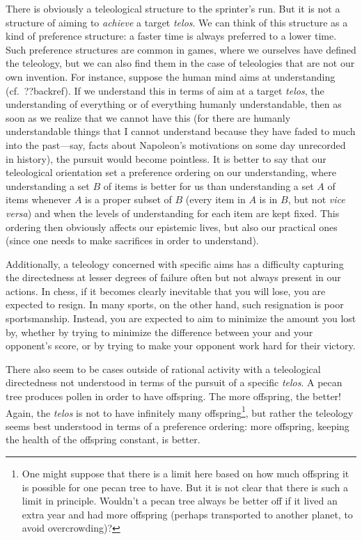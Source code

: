There is obviously a teleological structure to the sprinter's run. But it is not a structure of aiming to \textit{achieve} a 
target \textit{telos}. 
We can think of this structure as a kind of preference structure: a faster time is always preferred to a lower time. 
Such preference structures are common in games, where we ourselves have defined the teleology, but we can also find them in the 
case of teleologies that are not our own invention. For instance, suppose the human mind aims at understanding (cf.~??backref). If we understand
this in terms of aim at a target \textit{telos}, the understanding of everything or of everything humanly understandable, then as soon as 
we realize that we cannot have this (for there are humanly understandable things that I cannot understand because they have faded to much
into the past---say, facts about Napoleon's motivations on some day unrecorded in history), the pursuit would become pointless. 
It is better to say that our teleological orientation set a preference ordering on our understanding, where understanding a set
$B$ of items is better for us than understanding a set $A$ of items whenever $A$ is a proper subset of $B$ (every item in $A$ is
in $B$, but not \textit{vice versa}) and when the levels of understanding for each item are kept fixed. This ordering then obviously
affects our epistemic lives, but also our practical ones (since one needs to make sacrifices in order to understand).

Additionally, a teleology concerned with specific aims has a difficulty capturing the directedness at lesser
degrees of failure often but not always present in our actions. In chess, if it becomes clearly inevitable that
you will lose, you are expected to resign. In many sports, on the other hand, such resignation is poor sportsmanship.
Instead, you are expected to aim to minimize the amount you lost by, whether by trying to minimize the difference
between your and your opponent's score, or by trying to make your opponent work hard for their victory.

There also seem to be cases outside of rational activity with a teleological directedness not understood in terms of the pursuit of a specific \textit{telos}. 
A pecan tree produces pollen in order to have offspring. The more offspring, the better! Again, the 
\textit{telos} is not to have infinitely many offspring\footnote{One might suppose that there is a limit here based on how much offspring
it is possible for one pecan tree to have. But it is not clear that there is such a limit in principle. Wouldn't a pecan tree always be better
off if it lived an extra year and had more offspring (perhaps transported to another planet, to avoid overcrowding)?}, but rather the teleology
seems best understood in terms of a preference ordering: more offspring, keeping the health of the offspring constant, is better.

